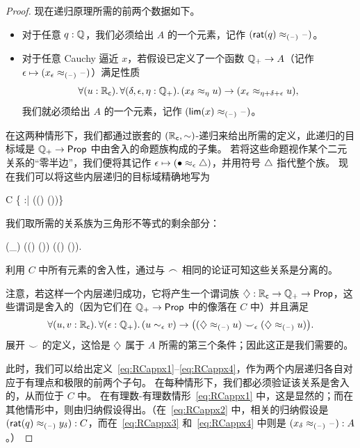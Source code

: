 \begin{proof}
  现在递归原理所需的前两个数据如下。
  \begin{itemize}
  \item 对于任意 $q:\mathbb{Q}$，我们必须给出 $A$ 的一个元素，记作 $(\mathsf{rat}(q)\approx_{(\mathord{\hspace{1pt}\text{--}\hspace{1pt}})} \mathord{\hspace{1pt}\text{--}\hspace{1pt}})$。
  \item 对于任意 Cauchy 逼近 $x$，若假设已定义了一个函数 $\mathbb{Q}_{+} \to A$（记作 $\epsilon \mapsto (x_\epsilon \approx_{(\mathord{\hspace{1pt}\text{--}\hspace{1pt}})} \mathord{\hspace{1pt}\text{--}\hspace{1pt}})$）满足性质
    \begin{equation}
      \fall{u:\RC}{\delta,\epsilon,\eta:\Qp} (x_\delta \approx_\eta u) \to (x_\epsilon \approx_{\eta+\delta+\epsilon} u),\label{eq:appxrec2}
    \end{equation}
    我们就必须给出 $A$ 的一个元素，记作 $(\mathsf{lim}(x)\approx_{(\mathord{\hspace{1pt}\text{--}\hspace{1pt}})} \mathord{\hspace{1pt}\text{--}\hspace{1pt}})$。
  \end{itemize}
  在这两种情形下，我们都通过嵌套的 $(\mathbb{R}_\mathsf{c},\mathord\sim)$-递归来给出所需的定义，此递归的目标域是 $\mathbb{Q}_{+}\to\mathsf{Prop}$ 中由舍入的命题族构成的子集。
  若将这些命题视作某个二元关系的“零半边”，我们便将其记作 $\epsilon \mapsto (\bullet\approx_{\epsilon}\triangle)$，并用符号 $\triangle$ 指代整个族。
  现在我们可以将这些内层递归的目标域精确地写为
  \begin{narrowmultline*}
    C 
    \bigg\{ \tapname :\Qp\to\prop \;\;\Big|\;\; \narrowbreak
    \fall{\epsilon:\Qp} \Big((\tap\epsilon) \Leftrightarrow \exis{\theta:\Qp} (\tap{\epsilon-\theta})\Big)\bigg\}
  \end{narrowmultline*}
  我们取所需的关系族为三角形不等式的剩余部分：
  \begin{narrowmultline*}
    (\tapname \bbsim_\epsilon \tapbname) 
    \fall{\eta:\Qp} ((\tap\eta) \to (\tapb{\epsilon+\eta})) \land
    \narrowbreak
    ((\tapb\eta) \to (\tap{\epsilon+\eta})).
  \end{narrowmultline*}
  利用 $C$ 中所有元素的舍入性，通过与 $\frown$ 相同的论证可知这些关系是分离的。

  注意，若这样一个内层递归成功，它将产生一个谓词族 $\diamondsuit : \mathbb{R}_\mathsf{c}\to\mathbb{Q}_{+}\to \mathsf{Prop}$，这些谓词是舍入的（因为它们在 $\mathbb{Q}_{+}\to\mathsf{Prop}$ 中的像落在 $C$ 中）并且满足
  \[ \fall{u,v:\RC}{\epsilon:\Qp} (u\close\epsilon v) \to \big((\hapx_{(\blank)} u) \bbsim_\epsilon (\hapx_{(\blank)} u)\big). \]
  展开 $\smile$ 的定义，这恰是 $\diamondsuit$ 属于 $A$ 所需的第三个条件；因此这正是我们需要的。

  此时，我们可以给出定义~\eqref{eq:RCappx1}--\eqref{eq:RCappx4}，作为两个内层递归各自对应于有理点和极限的前两个子句。
  在每种情形下，我们都必须验证该关系是舍入的，从而位于 $C$ 中。
  在有理数-有理数情形~\eqref{eq:RCappx1} 中，这是显然的；而在其他情形中，则由归纳假设得出。（在~\eqref{eq:RCappx2} 中，相关的归纳假设是 $(\mathsf{rat}(q) \approx_{(\mathord{\hspace{1pt}\text{--}\hspace{1pt}})} y_\delta) : C$，而在~\eqref{eq:RCappx3} 和~\eqref{eq:RCappx4} 中则是 $(x_\delta \approx_{(\mathord{\hspace{1pt}\text{--}\hspace{1pt}})} \mathord{\hspace{1pt}\text{--}\hspace{1pt}}) : A$。）


\end{proof}
